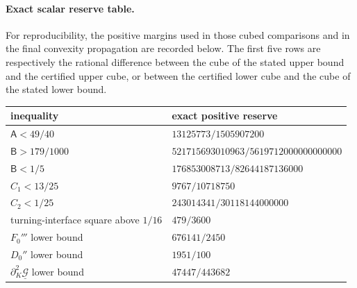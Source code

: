 \paragraph{Exact scalar reserve table.}
For reproducibility, the positive margins used in those cubed comparisons
and in the final convexity propagation are recorded below.  The first five
rows are respectively the rational difference between the cube of the stated
upper bound and the certified upper cube, or between the certified lower cube
and the cube of the stated lower bound.
\begin{center}
\small
\begin{tabular}{@{}ll@{}}
\toprule
inequality&exact positive reserve\\
\midrule
\(\mathsf A<49/40\)&\(13125773/1505907200\)\\
\(\mathsf B>179/1000\)&
\(521715693010963/5619712000000000000\)\\
\(\mathsf B<1/5\)&\(176853008713/82644187136000\)\\
\(C_1<13/25\)&\(9767/10718750\)\\
\(C_2<1/25\)&\(243014341/30118144000000\)\\
turning-interface square above \(1/16\)&\(479/3600\)\\
\(F_0'''\) lower bound&\(676141/2450\)\\
\(D_0''\) lower bound&\(1951/100\)\\
\(\partial_K^2\underline{\mathcal G}\) lower bound&
\(47447/443682\)\\
\bottomrule
\end{tabular}
\end{center}

